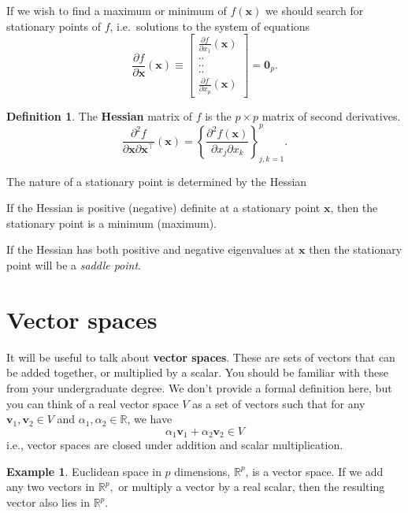 \documentclass[]{book}
\theoremstyle{definition}
\newtheorem{definition}{Definition}[chapter]
\theoremstyle{definition}
\newtheorem{example}{Example}[chapter]
\theoremstyle{definition}
\theoremstyle{remark}
\begin{document}
If we wish to find a maximum or minimum of \(f(\mathbf x)\) we should search for stationary points of \(f\),
i.e.~solutions to the system of equations
\[
\frac{\partial f}{\partial \mathbf x}(\mathbf x)\equiv \left [ \begin{array}{c} \frac{\partial f}{\partial x_1}(\mathbf x)\\
 ..\\
 ..\\
 ..\\
 \frac{\partial f}{\partial x_p}(\mathbf x)
\end{array} \right ]={\mathbf 0}_p.
\]
\begin{definition}
\protect\hypertarget{def:hessian}{}{\label{def:hessian} }The \textbf{Hessian} matrix of \(f\) is the \(p \times p\) matrix of second derivatives.
\[
\frac{\partial^2f}{\partial \mathbf x\partial \mathbf x^\top}(\mathbf x) =\left \{ \frac{\partial^2 f(\mathbf x)}{\partial x_j \partial x_k}\right \}_{j,k=1}^p.
\]
\end{definition}

The nature of a stationary point is determined by the Hessian

If the Hessian is positive (negative) definite at a stationary point \(\mathbf x\), then the stationary point is a minimum (maximum).

If the Hessian has both positive and negative eigenvalues at \(\mathbf x\) then the stationary point will be a \emph{saddle point}.

\hypertarget{linalg-vecspaces}{%
\section{Vector spaces}\label{linalg-vecspaces}}

It will be useful to talk about \textbf{vector spaces}. These are sets of vectors that can be added together, or multiplied by a scalar. You should be familiar with these from your undergraduate degree. We don't provide a formal definition here, but you can think of a real vector space \(V\) as a set of vectors such that for any \(\mathbf v_1, \mathbf v_2 \in V\) and \(\alpha_1, \alpha_2 \in \mathbb{R}\), we have
\[\alpha_1 \mathbf v_1 + \alpha_2 \mathbf v_2 \in V\]
i.e., vector spaces are closed under addition and scalar multiplication.

\begin{example}
\protect\hypertarget{exm:Rp}{}{\label{exm:Rp} }Euclidean space in \(p\) dimensions, \(\mathbb{R}^p\), is a vector space. If we add any two vectors in \(\mathbb{R}^p,\) or multiply a vector by a real scalar, then the resulting vector also lies in \(\mathbb{R}^p\).
\end{example}
\end{document}

